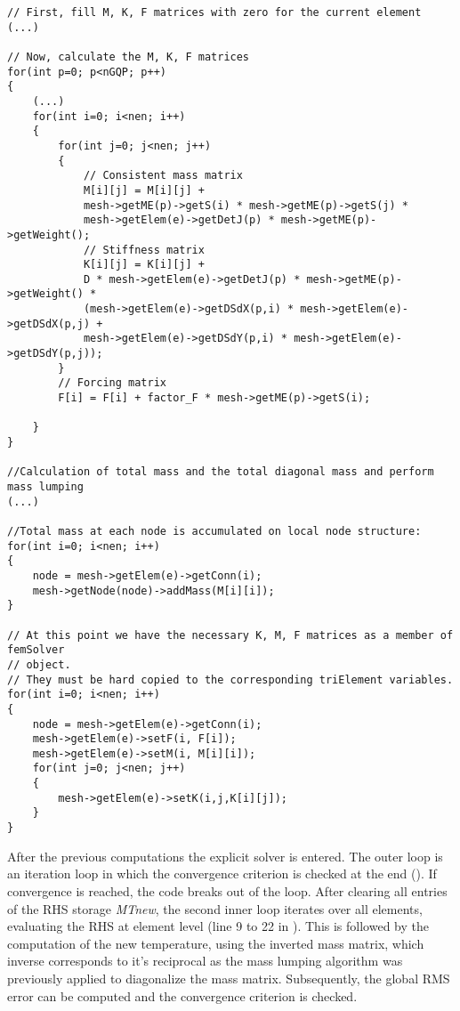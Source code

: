 \begin{lstlisting}[caption={\label{Code:Serial1} Calculation of Element Matrices}]
// First, fill M, K, F matrices with zero for the current element
(...)

// Now, calculate the M, K, F matrices
for(int p=0; p<nGQP; p++)
{   
	(...)
	for(int i=0; i<nen; i++)
	{
		for(int j=0; j<nen; j++)
		{
			// Consistent mass matrix
			M[i][j] = M[i][j] +
			mesh->getME(p)->getS(i) * mesh->getME(p)->getS(j) *
			mesh->getElem(e)->getDetJ(p) * mesh->getME(p)->getWeight();
			// Stiffness matrix
			K[i][j] = K[i][j] +
			D * mesh->getElem(e)->getDetJ(p) * mesh->getME(p)->getWeight() *
			(mesh->getElem(e)->getDSdX(p,i) * mesh->getElem(e)->getDSdX(p,j) +
			mesh->getElem(e)->getDSdY(p,i) * mesh->getElem(e)->getDSdY(p,j));
		}
		// Forcing matrix
		F[i] = F[i] + factor_F * mesh->getME(p)->getS(i);
		
	}
}

//Calculation of total mass and the total diagonal mass and perform mass lumping
(...)

//Total mass at each node is accumulated on local node structure:
for(int i=0; i<nen; i++)
{
	node = mesh->getElem(e)->getConn(i);
	mesh->getNode(node)->addMass(M[i][i]);
}

// At this point we have the necessary K, M, F matrices as a member of femSolver 
// object.
// They must be hard copied to the corresponding triElement variables.
for(int i=0; i<nen; i++)
{
	node = mesh->getElem(e)->getConn(i);
	mesh->getElem(e)->setF(i, F[i]);
	mesh->getElem(e)->setM(i, M[i][i]);
	for(int j=0; j<nen; j++)
	{
		mesh->getElem(e)->setK(i,j,K[i][j]);
	}
}
\end{lstlisting}

After the previous computations the explicit solver is entered. The outer loop is an iteration loop in which the convergence criterion is checked at the end (). If convergence is reached, the code breaks out of the loop. After clearing all entries of the RHS storage \textit{MTnew}, the second inner loop iterates over all elements, evaluating the RHS at element level (line 9 to 22 in ). This is followed by the computation of the new temperature, using the inverted mass matrix, which inverse corresponds to it's reciprocal as the mass lumping algorithm was previously applied to diagonalize the mass matrix. Subsequently, the global RMS error can be computed and the convergence criterion is checked.

